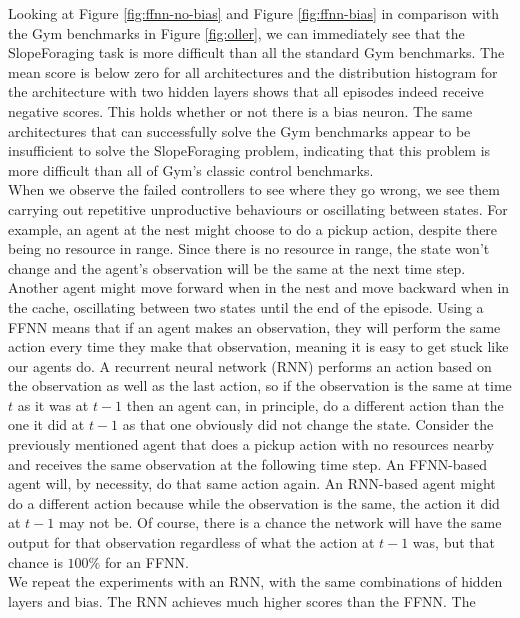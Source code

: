 \documentclass[12pt]{article}
\begin{document}
Looking at Figure \ref{fig:ffnn-no-bias} and Figure \ref{fig:ffnn-bias} in comparison with the Gym benchmarks in Figure \ref{fig:oller}, we can immediately see that the SlopeForaging task is more difficult than all the standard Gym benchmarks.
The mean score is below zero for all architectures and the distribution histogram for the architecture with two hidden layers shows that all episodes indeed receive negative scores.
This holds whether or not there is a bias neuron.
The same architectures that can successfully solve the Gym benchmarks appear to be insufficient to solve the SlopeForaging problem, indicating that this problem is more difficult than all of Gym's classic control benchmarks.\\

When we observe the failed controllers to see where they go wrong, we see them carrying out repetitive unproductive behaviours or oscillating between states.
For example, an agent at the nest might choose to do a pickup action, despite there being no resource in range.
Since there is no resource in range, the state won't change and the agent's observation will be the same at the next time step.
Another agent might move forward when in the nest and move backward when in the cache, oscillating between two states until the end of the episode.
Using a FFNN means that if an agent makes an observation, they will perform the same action every time they make that observation, meaning it is easy to get stuck like our agents do.
A recurrent neural network (RNN) performs an action based on the observation as well as the last action, so if the observation is the same at time $t$ as it was at $t-1$ then an agent can, in principle, do a different action than the one it did at $t-1$ as that one obviously did not change the state.
Consider the previously mentioned agent that does a pickup action with no resources nearby and receives the same observation at the following time step.
An FFNN-based agent will, by necessity, do that same action again.
An RNN-based agent might do a different action because while the observation is the same, the action it did at $t-1$ may not be.
Of course, there is a chance the network will have the same output for that observation regardless of what the action at $t-1$ was, but that chance is $100\%$ for an FFNN.\\

We repeat the experiments with an RNN, with the same combinations of hidden layers and bias.
The RNN achieves much higher scores than the FFNN.
The 
\end{document}

